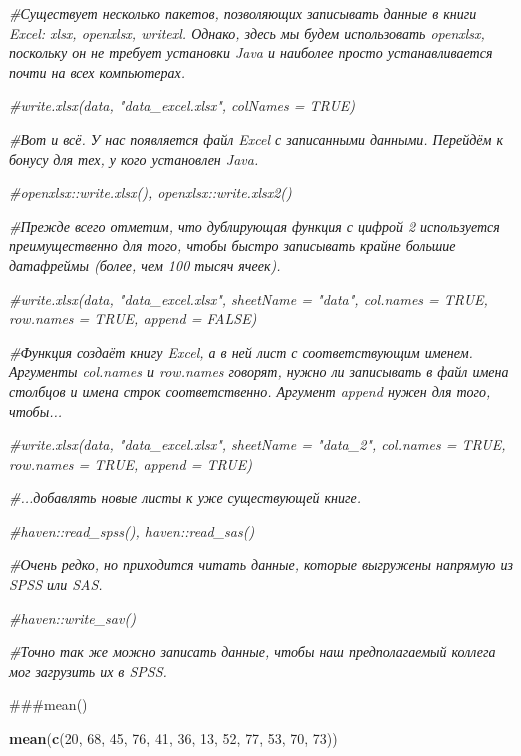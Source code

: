\documentclass[
]{article}
\newenvironment{Shaded}{\begin{snugshade}}{\end{snugshade}}
\newcommand{\CommentTok}[1]{\textcolor[rgb]{0.56,0.35,0.01}{\textit{#1}}}
\newcommand{\DecValTok}[1]{\textcolor[rgb]{0.00,0.00,0.81}{#1}}
\newcommand{\FunctionTok}[1]{\textcolor[rgb]{0.13,0.29,0.53}{\textbf{#1}}}
\newcommand{\NormalTok}[1]{#1}
\begin{document}
\begin{Shaded}
\begin{Highlighting}[]
\CommentTok{\#Существует несколько пакетов, позволяющих записывать данные в книги Excel: xlsx, openxlsx, writexl. Однако, здесь мы будем использовать openxlsx, поскольку он не требует установки Java и наиболее просто устанавливается почти на всех компьютерах.}

\CommentTok{\#write.xlsx(data, "data\_excel.xlsx", colNames = TRUE)}

\CommentTok{\#Вот и всё. У нас появляется файл Excel с записанными данными. Перейдём к бонусу для тех, у кого установлен Java.}

\CommentTok{\#openxlsx::write.xlsx(), openxlsx::write.xlsx2()}

\CommentTok{\#Прежде всего отметим, что дублирующая функция с цифрой 2 используется преимущественно для того, чтобы быстро записывать крайне большие датафреймы (более, чем 100 тысяч ячеек).}

\CommentTok{\#write.xlsx(data, "data\_excel.xlsx", sheetName = "data", col.names = TRUE, row.names = TRUE, append = FALSE)}

\CommentTok{\#Функция создаёт книгу Excel, а в ней лист с соответствующим именем. Аргументы col.names и row.names говорят, нужно ли записывать в файл имена столбцов и имена строк соответственно. Аргумент append нужен для того, чтобы...}

\CommentTok{\#write.xlsx(data, "data\_excel.xlsx", sheetName = "data\_2", col.names = TRUE, row.names = TRUE, append = TRUE)}

\CommentTok{\#...добавлять новые листы к уже существующей книге. }

\CommentTok{\#haven::read\_spss(), haven::read\_sas()}

\CommentTok{\#Очень редко, но приходится читать данные, которые выгружены напрямую из SPSS или SAS.}

\CommentTok{\#haven::write\_sav() }

\CommentTok{\#Точно так же можно записать данные, чтобы наш предполагаемый коллега мог загрузить их в SPSS.}
\end{Highlighting}
\end{Shaded}

\#\#\#mean()

\begin{Shaded}
\begin{Highlighting}[]
\FunctionTok{mean}\NormalTok{(}\FunctionTok{c}\NormalTok{(}\DecValTok{20}\NormalTok{, }\DecValTok{68}\NormalTok{, }\DecValTok{45}\NormalTok{, }\DecValTok{76}\NormalTok{, }\DecValTok{41}\NormalTok{, }\DecValTok{36}\NormalTok{, }\DecValTok{13}\NormalTok{, }\DecValTok{52}\NormalTok{, }\DecValTok{77}\NormalTok{, }\DecValTok{53}\NormalTok{, }\DecValTok{70}\NormalTok{, }\DecValTok{73}\NormalTok{))}
\end{Highlighting}
\end{Shaded}
\end{document}
